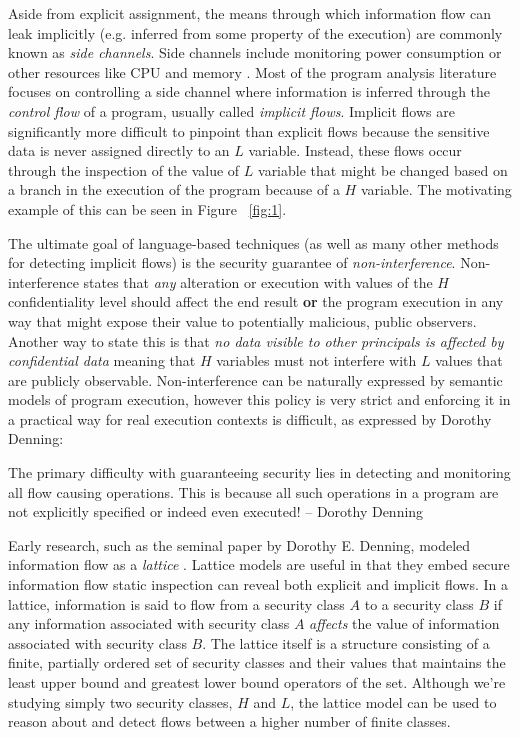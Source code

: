 \documentclass[preprint]{sigplanconf}
\begin{document}
Aside from explicit assignment, the means through which information flow can leak implicitly (e.g. inferred from some property of the execution) are commonly known as \textit{side channels}. Side channels include monitoring power consumption \cite{kocher1999differential} or other resources like CPU and memory \cite{yarom2013flush}. Most of the program analysis literature focuses on controlling a side channel where information is inferred through the \textit{control flow} of a program, usually called \textit{implicit flows}. Implicit flows are significantly more difficult to pinpoint than explicit flows because the sensitive data is never assigned directly to an $L$ variable. Instead, these flows occur through the inspection of the value of $L$ variable that might be changed based on a branch in the execution of the program because of a $H$ variable. The motivating example of this can be seen in Figure ~\ref{fig:1}.


The ultimate goal of language-based techniques (as well as many other methods for detecting implicit flows) is the security guarantee of \textit{non-interference}. Non-interference states that \textit{any} alteration or execution with values of the $H$ confidentiality level should  affect the end result \textbf{or} the program execution in any way that might expose their value to potentially malicious, public observers. Another way to state this is that \textit{no data visible to other principals is affected by confidential data} meaning that $H$ variables must not interfere with $L$ values that are publicly observable. Non-interference can be naturally expressed by semantic models of program execution, however this policy is very strict and enforcing it in a practical way for real execution contexts is difficult, as expressed by Dorothy Denning:

\begin{displayquote}
The primary difficulty with guaranteeing security lies in detecting and monitoring all flow causing operations. This is because all such operations in a program are not explicitly specified or indeed even executed! -- Dorothy Denning
\end{displayquote}

Early research, such as the seminal paper by Dorothy E. Denning, modeled information flow as a \textit{lattice} \cite{denning1976lattice}. Lattice models are useful in that they embed secure information flow static inspection can reveal both explicit and implicit flows. In a lattice, information is said to flow from a security class $A$ to a security class $B$ if any information associated with security class $A$ \textit{affects} the value of information associated with security class $B$. The lattice itself is a structure consisting of a finite, partially ordered set of security classes and their values that maintains the least upper bound and greatest lower bound operators of the set. Although we're studying simply two security classes, $H$ and $L$, the lattice model can be used to reason about and detect flows between a higher number of finite classes.
\end{document}
